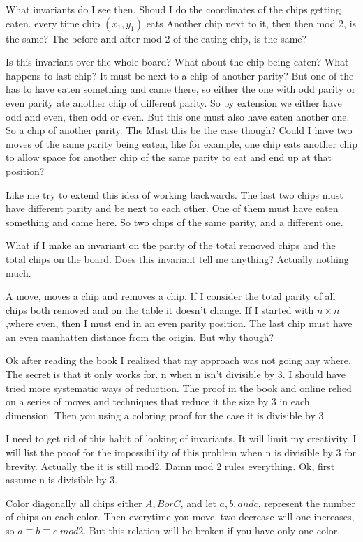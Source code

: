 \documentclass[12pt,tikz,border=10pt]{article}
\theoremstyle{definition}
\theoremstyle{remark}
\begin{document}
What invariants do I see then. Shoud I do the coordinates of the chips getting eaten. every time chip $(x_1,y_1)$ eats
Another chip next to it, then then mod 2, is the same? The before and after mod 2 of the eating chip, is the same?

Is this invariant over the whole board? What about the chip being eaten?
What happens to last chip? It must be next to a chip of another parity? But one of the has to have eaten something 
and came there, so either the one with odd parity or even parity ate another chip of different parity.
So by extension we either have odd and even, then odd or even. But this one must also have eaten another one.
So a chip of another parity. The Must this be the case though? Could I have two moves of the same parity being eaten, like for example, 
one chip eats another chip to allow space for another chip of the same parity to eat and end up at that position?

Like me try to extend this idea of working backwards. The last two chips must have different parity and be next to each other.
One of them must have eaten something and came here. So two chips of the same parity, and a different one.

What if I make an invariant on the parity of the total removed chips and the total chips on the board. Does this invariant tell me 
anything? Actually nothing much. 

A move, moves a chip and removes a chip. If I consider the total parity of all chips both removed and 
on the table it doesn't change. If I started with $n\times n$,where even, then I must end in an even parity position.
The last chip must have an even manhatten distance from the origin. But why though?

Ok after reading the book I realized that my approach was not going any where. The secret is that it only works for.
n when n isn't divisible by 3. I should have tried more systematic ways of reduction. The proof in the book and online 
relied on a series of moves and techniques that reduce it the size by 3 in each dimension. Then you using a coloring proof 
for the case it is divisible by 3. 

I need to get rid of this habit of looking of invariants. It will limit my creativity.
I will list the proof for the impossibility of this problem when n is divisible by 3 for brevity.
Actually the it is still mod2. Damn mod 2 rules everything. Ok, first assume n is divisible by 3.

Color diagonally all chips either $A, B or C$, and let $a,b, and c$, represent the number of chips on each color.
Then everytime you move, two decrease will one increases, so $a \equiv b \equiv c \; mod2$. But this relation 
will be broken if you have only one color.
\end{document}
